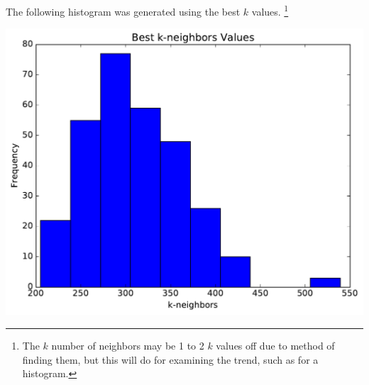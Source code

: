 \documentclass[a4paper]{article}
\begin{document}
\begin {description}
\begin{doublespace}
The following histogram was generated using the best $k$ values. \footnote{The $k$ number of neighbors may be 1 to 2 $k$ values off due to method of finding them, but this will do for examining the trend, such as for a histogram.}
\begin{center}
\includegraphics[scale=0.75]{khistogram.pdf}
\end{center}


\end{doublespace}

\end {description}
\end{document}
